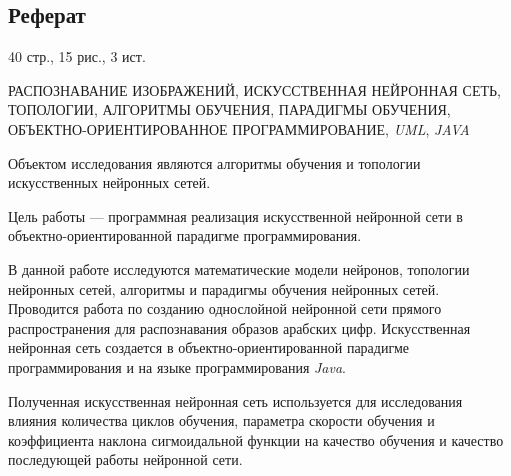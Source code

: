 \begin{center}
\section*{Реферат}
\end{center}

\vspace{2em}
40 стр., 15 рис., 3 ист.

\vspace{2em}
РАСПОЗНАВАНИЕ ИЗОБРАЖЕНИЙ, ИСКУССТВЕННАЯ НЕЙРОННАЯ СЕТЬ, ТОПОЛОГИИ, АЛГОРИТМЫ ОБУЧЕНИЯ, ПАРАДИГМЫ ОБУЧЕНИЯ, ОБЪЕКТНО-ОРИ\-ЕН\-ТИ\-РО\-ВАН\-НОЕ ПРОГРАММИРОВАНИЕ, {\it UML}, {\it JAVA}

\vspace{2em}
Объектом исследования являются алгоритмы обучения и топологии искусственных нейронных сетей.

Цель работы --- программная реализация искусственной нейронной сети в объектно-ори\-ен\-ти\-ро\-ван\-ной парадигме программирования.

В данной работе исследуются математические модели нейронов, топологии нейронных сетей, алгоритмы и парадигмы обучения нейронных сетей.
Проводится работа по созданию однослойной нейронной сети прямого распространения для распознавания образов арабских цифр.
Искусственная нейронная сеть создается в объектно-ори\-ен\-ти\-ро\-ван\-ной парадигме программирования и на языке программирования {\it Java}.

Полученная искусственная нейронная сеть используется для исследования влияния количества циклов обучения, параметра скорости обучения и коэффициента наклона сигмоидальной функции на качество обучения и качество последующей работы нейронной сети.

\newpage